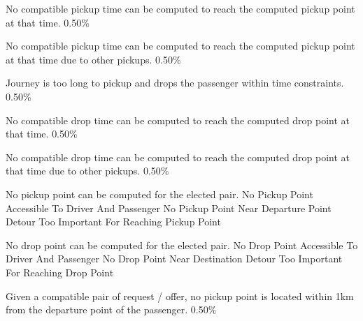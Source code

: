   \startkaosspec
  	 {No compatible pickup time can be computed to reach the computed pickup point at that time.}
  	 {0.50\%}
  \stopkaosspec

  \startkaosspec
  	 {No compatible pickup time can be computed to reach the computed pickup point at that time due to other pickups.}
  	 {0.50\%}
  \stopkaosspec

  \startkaosspec
  	 {Journey is too long to pickup and drops the passenger within time constraints.}
  	 {0.50\%}
  \stopkaosspec

  \startkaosspec
  	 {No compatible drop time can be computed to reach the computed drop point at that time.}
  	 {0.50\%}
  \stopkaosspec

  \startkaosspec
  	 {No compatible drop time can be computed to reach the computed drop point at that time due to other pickups.}
  	 {0.50\%}
  \stopkaosspec

    {}
  
  \startkaosspec
  	 {No pickup point can be computed for the elected pair.}
  	 {No Pickup Point Accessible To Driver And Passenger}
  	 {No Pickup Point Near Departure Point}
  	 {Detour Too Important For Reaching Pickup Point}
  \stopkaosspec
  
  \startkaosspec
  	 {No drop point can be computed for the elected pair.}
  	 {No Drop Point Accessible To Driver And Passenger}
  	 {No Drop Point Near Destination}
  	 {Detour Too Important For Reaching Drop Point}
  \stopkaosspec
  
  \startkaosspec
  	 {Given a compatible pair of request / offer, no pickup point is located within 1km from the departure point of the passenger.}
  	 {0.50\%}
  \stopkaosspec
  
